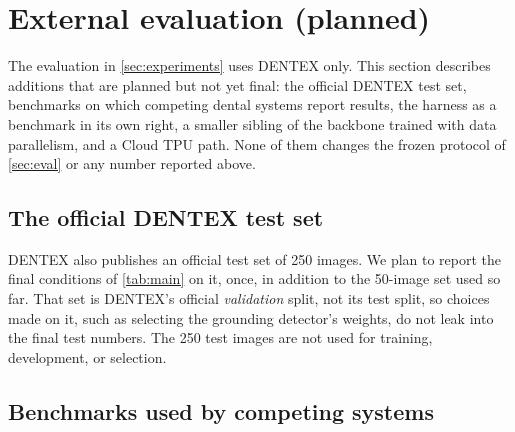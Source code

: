 \section{External evaluation (planned)}
\label{sec:external}

The evaluation in \cref{sec:experiments} uses DENTEX only. This section describes additions that are planned
but not yet final: the official DENTEX test set, benchmarks on which competing dental systems report results, the
harness as a benchmark in its own right, a smaller sibling of the backbone trained with data parallelism, and a Cloud TPU
path. None of them changes the frozen protocol of \cref{sec:eval} or any number reported above.

\subsection{The official DENTEX test set}
\label{sec:official-test}

DENTEX also publishes an official test set of 250 images. We plan to report the final conditions of \cref{tab:main} on it,
once, in addition to the 50-image set used so far. That set is DENTEX's official \emph{validation} split, not its test
split, so choices made on it, such as selecting the grounding detector's weights, do not leak into the final test
numbers. The 250 test images are not used for training, development, or selection.

\subsection{Benchmarks used by competing systems}
\label{sec:external-benchmarks}

